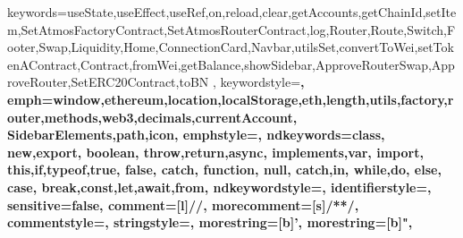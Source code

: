 {
keywords={useState,useEffect,useRef,on,reload,clear,getAccounts,getChainId,setItem,SetAtmosFactoryContract,SetAtmosRouterContract,log,Router,Route,Switch,Footer,Swap,Liquidity,Home,ConnectionCard,Navbar,utilsSet,convertToWei,setTokenAContract,Contract,fromWei,getBalance,showSidebar,ApproveRouterSwap,ApproveRouter,SetERC20Contract,toBN
},
keywordstyle=\color{yellowFunction}\bfseries,
emph={window,ethereum,location,localStorage,eth,length,utils,factory,router,methods,web3,decimals,currentAccount, SidebarElements,path,icon},
emphstyle=\color{purpleWords}\bfseries,
ndkeywords={class, new,export, boolean, throw,return,async, implements,var, import, this,if,typeof,true, false, catch, function, null, catch,in, while,do, else, case, break,const,let,await,from},
ndkeywordstyle=\color{orangeWords}\bfseries,
identifierstyle=\color{black},
sensitive=false,
comment=[l]{//},
morecomment=[s]{/*}{*/},
commentstyle=\color{greyWords}\ttfamily,
stringstyle=\color{editorGreen}\ttfamily,
morestring=[b]',
morestring=[b]",
}










